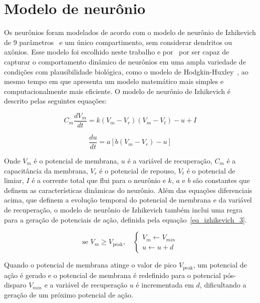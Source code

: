 \section{Modelo de neurônio}

Os neurônios foram modelados de acordo com o modelo de neurônio de Izhikevich de 9
parâmetros~\cite[cap.~8]{izhikevichDynamical2006} e um único compartimento, sem considerar dendritos ou axônios. Esse modelo foi
escolhido neste trabalho e por~ por ser capaz de capturar o comportamento dinâmico de
neurônios em uma ampla variedade de condições com plausibilidade biológica, como o modelo de
Hodgkin-Huxley~\cite{hodgkinQuantitative1952b}, ao mesmo tempo em que apresenta um modelo matemático mais simples e
computacionalmente mais eficiente. O modelo de neurônio de Izhikevich é descrito pelas seguintes equações:


\begin{equation}
\label{eq_izhikevich_1}
C_m \frac{dV_m}{dt} = k (V_m - V_r)(V_m - V_t) - u + I
\end{equation}

\begin{equation}
\label{eq_izhikevich_2}
\frac{du}{dt} = a [b(V_m-V_r) - u]
\end{equation}

Onde $V_m$ é o potencial de membrana, $u$ é a variável de recuperação, $C_m$ é a capacitância da membrana, $V_r$ é o
potencial de repouso, $V_t$ é o potencial de limiar, $I$ é a corrente total que flui para o neurônio e $k$, $a$ e $b$ são
constantes que definem as características dinâmicas do neurônio. Além das equações diferenciais acima, que definem a evolução
temporal do potencial de membrana e da variável de recuperação, o modelo de neurônio de Izhikevich também inclui uma regra para
a geração de potenciais de ação, definida pela equação~\ref{eq_izhikevich_3}.

\begin{equation}
\label{eq_izhikevich_3}
\text{se } V_m \geq V_{\text{peak}}, \quad
\begin{cases}
V_m \gets V_{min} \\
u \gets u + d
\end{cases}
\end{equation}

Quando o potencial de membrana atinge o valor de pico $V_{\text{peak}}$, um potencial de ação é gerado e o potencial de membrana é
redefinido para o potencial pós-disparo $V_{min}$ e a variável de recuperação $u$ é incrementada em $d$, dificultando a geração de
um próximo potencial de ação.

